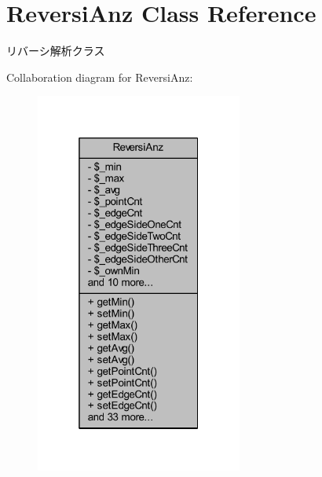 \hypertarget{class_reversi_anz}{}\section{Reversi\+Anz Class Reference}
\label{class_reversi_anz}


リバーシ解析クラス  




Collaboration diagram for Reversi\+Anz\+:
\nopagebreak
\begin{figure}[H]
\begin{center}
\leavevmode
\includegraphics[width=193pt]{class_reversi_anz__coll__graph}
\end{center}
\end{figure}
